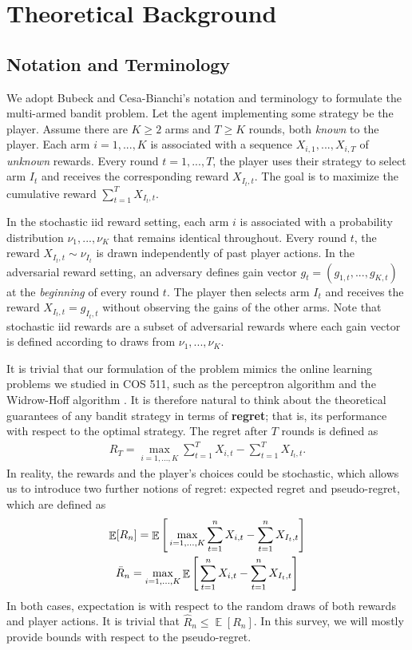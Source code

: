 \documentclass[12pt]{article}
\DeclareMathOperator*{\E}{\mathbb{E}}
\begin{document}
\section{Theoretical Background}

\subsection{Notation and Terminology}

We adopt Bubeck and Cesa-Bianchi's \cite{bubeck} notation and terminology to formulate the multi-armed bandit problem. Let the agent implementing some strategy be the player. Assume there are $K\geq 2$ arms and $T\geq K$ rounds, both \textit{known} to the player. Each arm $i=1,...,K$ is associated with a sequence $X_{i,1},...,X_{i,T}$ of \textit{unknown} rewards. Every round $t=1,...,T$, the player uses their strategy to select arm $I_{t}$ and receives the corresponding reward $X_{I_{t},t}$. The goal is to maximize the cumulative reward $\sum_{t=1}^{T}X_{I_{t},t}$.

In the stochastic iid reward setting, each arm $i$ is associated with a probability distribution $\nu_{1},...,\nu_{K}$ that remains identical throughout. Every round $t$, the reward $X_{I_{t},t}\sim\nu_{I_{t}}$ is drawn independently of past player actions. In the adversarial reward setting, an adversary defines gain vector $g_{t}=(g_{1,t},...,g_{K,t})$ at the \textit{beginning} of every round $t$. The player then selects arm $I_{t}$ and receives the reward $X_{I_{t},t}=g_{I_{t},t}$ without observing the gains of the other arms. Note that stochastic iid rewards are a subset of adversarial rewards where each gain vector is defined according to draws from $\nu_{1},...,\nu_{K}$.

It is trivial that our formulation of the problem mimics the online learning problems we studied in COS 511, such as the perceptron algorithm \cite{lecture16} and the Widrow-Hoff algorithm \cite{lecture18}. It is therefore natural to think about the theoretical guarantees of any bandit strategy in terms of \textbf{regret}; that is, its performance with respect to the optimal strategy. The regret after $T$ rounds is defined as
\begin{align}
R_{T}=\max_{i=1,...,K}\sum_{t=1}^{T}X_{i,t}-\sum_{t=1}^{T}X_{I_{t},t}.
\end{align}
In reality, the rewards and the player's choices could be stochastic, which allows us to introduce two further notions of regret: expected regret and pseudo-regret, which are defined as
\begin{gather}
\E[R_{n}]=\E\Bigg{[}\max_{i=1,...,K}\sum_{t=1}^{n}X_{i,t}-\sum_{t=1}^{n}X_{I_{t},t}\Bigg{]} \\
\bar{R}_{n}=\max_{i=1,...,K}\E\Bigg{[}\sum_{t=1}^{n}X_{i,t}-\sum_{t=1}^{n}X_{I_{t},t}\Bigg{]}
\end{gather}
In both cases, expectation is with respect to the random draws of both rewards and player actions. It is trivial that $\hat{R}_{n}\leq\E[R_{n}]$. In this survey, we will mostly provide bounds with respect to the pseudo-regret.
\end{document}
